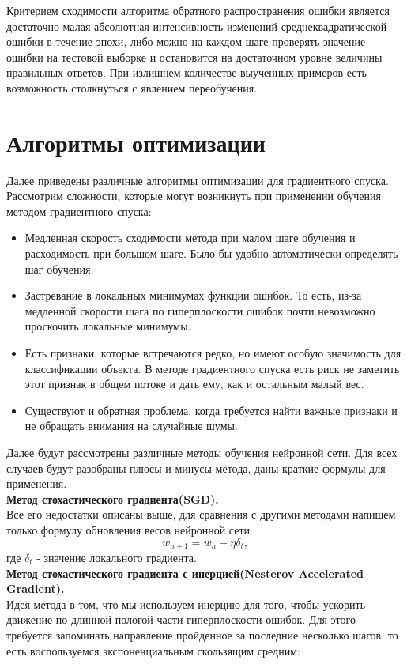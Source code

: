 \documentclass[oneside,final,14pt]{extreport}
\begin{document}
Критерием сходимости алгоритма обратного распространения ошибки является достаточно малая абсолютная интенсивность изменений среднеквадратической ошибки в течение эпохи, либо можно на каждом шаге проверять значение ошибки на тестовой выборке и остановится на достаточном уровне величины правильных ответов. При излишнем количестве выученных примеров есть возможность столкнуться с явлением переобучения.
\section{Алгоритмы оптимизации}
Далее приведены различные алгоритмы оптимизации для градиентного спуска.
Рассмотрим сложности, которые могут возникнуть при применении обучения  методом градиентного спуска:
\begin{itemize}
    \item Медленная скорость сходимости метода при малом шаге обучения и расходимость при большом шаге. Было бы удобно автоматически определять шаг обучения.
    \item Застревание в локальных минимумах функции ошибок. То есть, из-за медленной скорости шага по гиперплоскости ошибок почти невозможно проскочить локальные минимумы.
    \item Есть признаки, которые встречаются редко, но имеют особую значимость для классификации объекта. В методе градиентного спуска есть риск не заметить этот признак в общем потоке и дать ему, как и остальным малый вес.
    \item Существуют и обратная проблема, когда требуется найти важные признаки и не обращать внимания на случайные шумы.
\end{itemize}
Далее будут рассмотрены различные методы обучения нейронной сети. Для всех случаев будут разобраны плюсы и минусы метода, даны краткие формулы для применения. \\
\textbf{Метод стохастического градиента(SGD).}\\
Все его недостатки описаны выше, для сравнения с другими методами напишем только формулу обновления весов нейронной сети:
\[ w_{n+1} = w_n - \eta \delta_t,\]
где \(\delta_t\) - значение локального градиента.\\
\textbf{Метод стохастического градиента с инерцией(Nesterov Accelerated Gradient).}\cite{bib:nesterov} \\
Идея метода в том, что мы используем инерцию для того, чтобы ускорить движение по длинной пологой части гиперплоскости ошибок. Для этого требуется запоминать направление пройденное за последние несколько шагов, то есть воспользуемся экспоненциальным скользящим средним:
\end{document}
